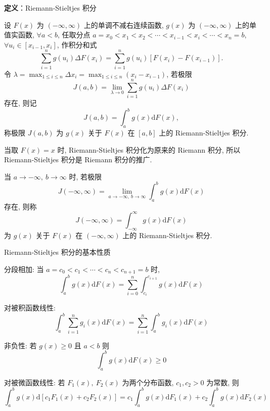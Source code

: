 \documentclass[openany]{ctexbook}
\theoremstyle{kaiti}
\theoremstyle{normal}
\begin{document}
\textbf{定义}：Riemann-Stieltjes 积分

设 $F(x)$ 为 $(-\infty,\infty)$ 上的单调不减右连续函数, $g(x)$ 为 $(-\infty,\infty)$ 上的单值实函数, $\forall a<b$, 任取分点 $a=x_0<x_1<x_2<\cdots<x_{i-1}<x_i<\cdots<x_n=b$, $\forall u_i\in[x_{i-1},x_i]$, 作积分和式
\begin{equation}
  \sum_{i=1}^ng(u_i)\Delta F(x_i)=\sum_{i=1}^ng(u_i)[F(x_i)-F(x_{i-1})].
\end{equation}
令 $\lambda=\max_{1\leqslant i\leqslant n}\Delta x_i=\max_{1\leqslant i\leqslant n}(x_i-x_{i-1})$, 若极限
\begin{equation}
  J(a,b)=\lim_{\lambda\to0}\sum_{i=1}^ng(u_i)\Delta F(x_i)
\end{equation}
存在, 则记
\begin{equation}
  J(a,b)=\int_a^bg(x)\mathrm{d}F(x),
\end{equation}
称极限 $J(a,b)$ 为 $g(x)$ 关于 $F(x)$ 在 $[a,b]$ 上的 Riemann-Stieltjes 积分.

当取 $F(x)=x$ 时, Riemann-Stieltjes 积分化为原来的 Riemann 积分, 所以 Riemann-Stieltjes 积分是 Riemann 积分的推广.

当 $a\to-\infty,~b\to\infty$ 时, 若极限
\begin{equation}
  J(-\infty,\infty)=\lim_{a\to-\infty,~b\to\infty}\int_a^bg(x)\mathrm{d}F(x)
\end{equation}
存在, 则称
\begin{equation}
  J(-\infty,\infty)=\int_{-\infty}^\infty g(x)\mathrm{d}F(x)
\end{equation}
为 $g(x)$ 关于 $F(x)$ 在 $(-\infty,\infty)$ 上的 Riemann-Stieltjes 积分.

Riemann-Stieltjes 积分的基本性质

分段相加: 当 $a=c_0<c_1<\cdots<c_n<c_{n+1}=b$ 时,
\begin{equation}
  \int_a^bg(x)\mathrm{d}F(x)=\sum_{i=0}^n\int_{c_i}^{c_{i+1}}g(x)\mathrm{d}F(x)
\end{equation}

对被积函数线性:
\begin{equation}
  \int_a^b\sum_{i=1}^ng_i(x)\mathrm{d}F(x)=\sum_{i=1}^n\int_a^bg_i(x)\mathrm{d}F(x)
\end{equation}

非负性: 若 $g(x)\geqslant0$ 且 $a<b$ 则
\begin{equation}
  \int_a^bg(x)\mathrm{d}F(x)\geqslant0
\end{equation}

对被微函数线性: 若 $F_1(x),~F_2(x)$ 为两个分布函数, $c_1,c_2>0$ 为常数, 则
\begin{equation}
  \int_a^bg(x)\mathrm{d}[c_1F_1(x)+c_2F_2(x)]=c_1\int_a^bg(x)\mathrm{d}F_1(x)+c_2\int_a^bg(x)\mathrm{d}F_2(x)
\end{equation}
\end{document}
